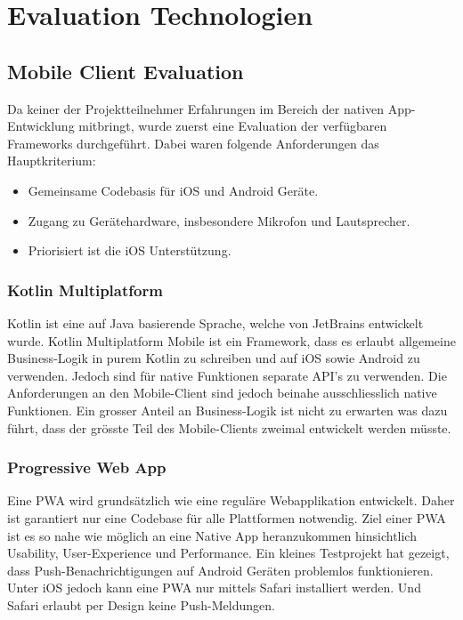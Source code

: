 \section{Evaluation Technologien}\label{sec:evaluation-technologien}

\subsection{Mobile Client Evaluation}\label{subsec:mobile-client-eval}

Da keiner der Projektteilnehmer Erfahrungen im Bereich der nativen App-Entwicklung mitbringt, wurde zuerst eine Evaluation der verfügbaren Frameworks durchgeführt.
Dabei waren folgende Anforderungen das Hauptkriterium:
\begin{itemize}
    \item Gemeinsame Codebasis für iOS und Android Geräte.
    \item Zugang zu Gerätehardware, insbesondere Mikrofon und Lautsprecher.
    \item Priorisiert ist die iOS Unterstützung.
\end{itemize}

\subsubsection*{Kotlin Multiplatform}
Kotlin ist eine auf Java basierende Sprache, welche von JetBrains entwickelt wurde.
Kotlin Multiplatform Mobile ist ein Framework, dass es erlaubt allgemeine Business-Logik in purem Kotlin zu schreiben und auf iOS sowie Android zu verwenden.
Jedoch sind für native Funktionen separate API's zu verwenden. Die Anforderungen an den Mobile-Client sind jedoch beinahe ausschliesslich native Funktionen.
Ein grosser Anteil an Business-Logik ist nicht zu erwarten was dazu führt, dass der grösste Teil des Mobile-Clients zweimal entwickelt werden müsste.\cite{kotlin-platform-specific-APIs}

\subsubsection*{Progressive Web App}
Eine PWA wird grundsätzlich wie eine reguläre Webapplikation entwickelt.
Daher ist garantiert nur eine Codebase für alle Plattformen notwendig.
Ziel einer PWA ist es so nahe wie möglich an eine Native App heranzukommen hinsichtlich Usability, User-Experience und Performance.\cite{what-are-PWAS}
Ein kleines Testprojekt hat gezeigt, dass Push-Benachrichtigungen auf Android Geräten problemlos funktionieren.
Unter iOS jedoch kann eine PWA nur mittels Safari installiert werden. Und Safari erlaubt per Design keine Push-Meldungen.\cite{canIUsePush,iOSSupportPush}

